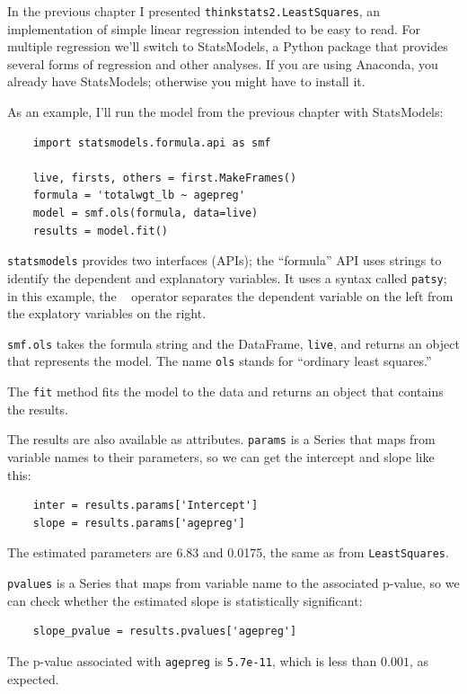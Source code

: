 \documentclass[12pt]{book}
\begin{document}
In the previous chapter I presented {\tt thinkstats2.LeastSquares}, an
implementation of simple linear regression intended to be easy to
read.  For multiple regression we'll switch to StatsModels, a Python
package that provides several forms of regression and other
analyses.  If you are using Anaconda, you already have StatsModels;
otherwise you might have to install it.

As an example, I'll run the model from the previous chapter with
StatsModels:

\begin{verbatim}
    import statsmodels.formula.api as smf

    live, firsts, others = first.MakeFrames()
    formula = 'totalwgt_lb ~ agepreg'
    model = smf.ols(formula, data=live)
    results = model.fit()
\end{verbatim}

{\tt statsmodels} provides two interfaces (APIs); the ``formula''
API uses strings to identify the dependent and explanatory variables.
It uses a syntax called {\tt patsy}; in this example, the {\tt ~}
operator separates the dependent variable on the left from the
explatory variables on the right.

{\tt smf.ols} takes the formula string and the DataFrame, {\tt live},
and returns an object that represents the model.  The name {\tt ols}
stands for ``ordinary least squares.''

The {\tt fit} method fits the model to the data and returns an
object that contains the results.  

The results are also available as attributes.  {\tt params}
is a Series that maps from variable names to their parameters, so we can
get the intercept and slope like this:

\begin{verbatim}
    inter = results.params['Intercept']
    slope = results.params['agepreg']
\end{verbatim}

The estimated parameters are 6.83 and 0.0175, the same as
from {\tt LeastSquares}.

{\tt pvalues} is a Series that maps from variable name to the associated
p-value, so we can check whether the estimated slope is statistically
significant:

\begin{verbatim}
    slope_pvalue = results.pvalues['agepreg']
\end{verbatim}

The p-value associated with {\tt agepreg} is {\tt 5.7e-11}, which
is less than $0.001$, as expected.
\end{document}
